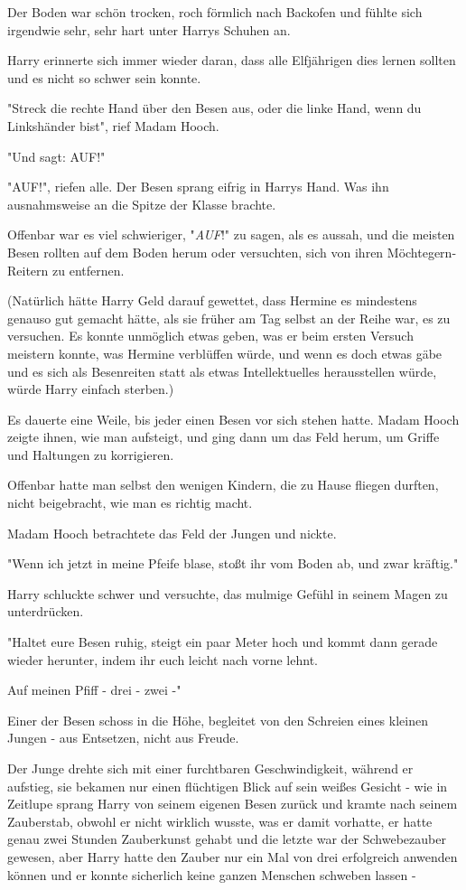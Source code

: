 {Der Boden war schön trocken, roch förmlich nach Backofen und fühlte sich irgendwie sehr, sehr hart unter Harrys Schuhen an.

Harry erinnerte sich immer wieder daran, dass alle Elfjährigen dies lernen sollten und es nicht so schwer sein konnte.

"Streck die rechte Hand über den Besen aus, oder die linke Hand, wenn du Linkshänder bist", rief Madam Hooch.

"Und sagt: AUF!"

"AUF!", riefen alle. Der Besen sprang eifrig in Harrys Hand. Was ihn ausnahmsweise an die Spitze der Klasse brachte.

Offenbar war es viel schwieriger, "\emph{AUF}!" zu sagen, als es aussah, und die meisten Besen rollten auf dem Boden herum oder versuchten, sich von ihren Möchtegern-Reitern zu entfernen.

(Natürlich hätte Harry Geld darauf gewettet, dass Hermine es mindestens genauso gut gemacht hätte, als sie früher am Tag selbst an der Reihe war, es zu versuchen. Es konnte unmöglich etwas geben, was er beim ersten Versuch meistern konnte, was Hermine verblüffen würde, und wenn es doch etwas gäbe und es sich als Besenreiten statt als etwas Intellektuelles herausstellen würde, würde Harry einfach sterben.)

Es dauerte eine Weile, bis jeder einen Besen vor sich stehen hatte. Madam Hooch zeigte ihnen, wie man aufsteigt, und ging dann um das Feld herum, um Griffe und Haltungen zu korrigieren.

Offenbar hatte man selbst den wenigen Kindern, die zu Hause fliegen durften, nicht beigebracht, wie man es richtig macht.

Madam Hooch betrachtete das Feld der Jungen und nickte.

"Wenn ich jetzt in meine Pfeife blase, stoßt ihr vom Boden ab, und zwar kräftig."

Harry schluckte schwer und versuchte, das mulmige Gefühl in seinem Magen zu unterdrücken.

"Haltet eure Besen ruhig, steigt ein paar Meter hoch und kommt dann gerade wieder herunter, indem ihr euch leicht nach vorne lehnt.

Auf meinen Pfiff - drei - zwei -"

Einer der Besen schoss in die Höhe, begleitet von den Schreien eines kleinen Jungen - aus Entsetzen, nicht aus Freude.

Der Junge drehte sich mit einer furchtbaren Geschwindigkeit, während er aufstieg, sie bekamen nur einen flüchtigen Blick auf sein weißes Gesicht - wie in Zeitlupe sprang Harry von seinem eigenen Besen zurück und kramte nach seinem Zauberstab, obwohl er nicht wirklich wusste, was er damit vorhatte, er hatte genau zwei Stunden Zauberkunst gehabt und die letzte war der Schwebezauber gewesen, aber Harry hatte den Zauber nur ein Mal von drei erfolgreich anwenden können und er konnte sicherlich keine ganzen Menschen schweben lassen -

}
